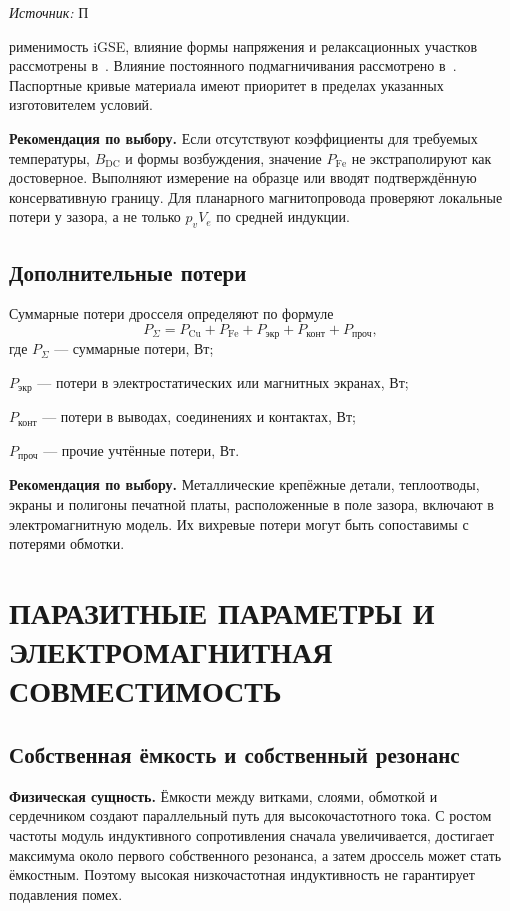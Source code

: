\documentclass[14pt,a4paper]{extarticle}
\newcommand{\source}[1]{\par\noindent\textit{Источник:} #1\par}
\newcommand{\phys}{\par\noindent\textbf{Физическая сущность.} }
\newcommand{\recommend}{\par\noindent\textbf{Рекомендация по выбору.} }
\begin{document}
\source Применимость iGSE, влияние формы напряжения и релаксационных
участков рассмотрены в~\cite{muehlethaler}. Влияние постоянного
подмагничивания рассмотрено в~\cite{sanusi}. Паспортные кривые материала
имеют приоритет в пределах указанных изготовителем условий.

\recommend Если отсутствуют коэффициенты для требуемых температуры,
$B_{\text{DC}}$ и формы возбуждения, значение $P_{\text{Fe}}$ не
экстраполируют как достоверное. Выполняют измерение на образце или
вводят подтверждённую консервативную границу. Для планарного
магнитопровода проверяют локальные потери у зазора, а не только
$p_v V_e$ по средней индукции.

\subsection{Дополнительные потери}

Суммарные потери дросселя определяют по формуле
\begin{equation}
 P_{\Sigma}=P_{\text{Cu}}+P_{\text{Fe}}+
 P_{\text{экр}}+P_{\text{конт}}+P_{\text{проч}},
 \label{eq:total-loss}
\end{equation}
где $P_{\Sigma}$ --- суммарные потери, Вт;\par\noindent
$P_{\text{экр}}$ --- потери в электростатических или магнитных экранах,
Вт;\par\noindent
$P_{\text{конт}}$ --- потери в выводах, соединениях и контактах, Вт;\par\noindent
$P_{\text{проч}}$ --- прочие учтённые потери, Вт.

\recommend Металлические крепёжные детали, теплоотводы, экраны и
полигоны печатной платы, расположенные в поле зазора, включают в
электромагнитную модель. Их вихревые потери могут быть сопоставимы с
потерями обмотки.

\section{ПАРАЗИТНЫЕ ПАРАМЕТРЫ И ЭЛЕКТРОМАГНИТНАЯ СОВМЕСТИМОСТЬ}
\label{sec:parasitics}

\subsection{Собственная ёмкость и собственный резонанс}

\phys Ёмкости между витками, слоями, обмоткой и сердечником создают
параллельный путь для высокочастотного тока. С ростом частоты модуль
индуктивного сопротивления сначала увеличивается, достигает максимума около
первого собственного резонанса, а затем дроссель может стать ёмкостным.
Поэтому высокая низкочастотная индуктивность не гарантирует подавления помех.
\end{document}
